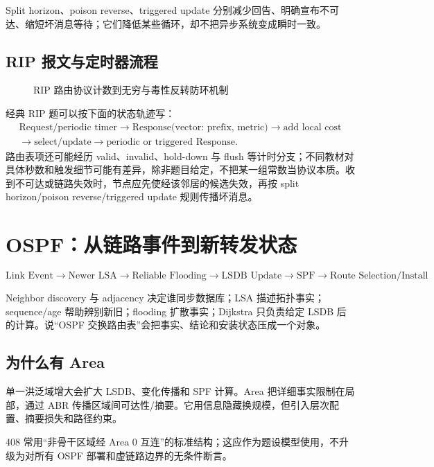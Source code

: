 \documentclass[11pt,a4paper]{ctexart}
\begin{document}
Split horizon、poison reverse、triggered update 分别减少回告、明确宣布不可达、缩短坏消息等待；它们降低某些循环，却不把异步系统变成瞬时一致。

\subsection{RIP 报文与定时器流程}

\begin{figure}[htbp]
  \centering
  \resizebox{0.96\linewidth}{!}{}
  \caption{RIP 路由协议计数到无穷与毒性反转防环机制}
  \label{fig:rip-count-infinity}
\end{figure}


经典 RIP 题可以按下面的状态轨迹写：
\[
\begin{gathered}
\text{Request/periodic timer}\to\text{Response(vector: prefix, metric)}\to\text{add local cost}\\
\to\text{select/update}\to\text{periodic or triggered Response}.
\end{gathered}
\]
路由表项还可能经历 valid、invalid、hold-down 与 flush 等计时分支；不同教材对具体秒数和触发细节可能有差异，除非题目给定，不把某一组常数当协议本质。收到不可达或链路失效时，节点应先使经该邻居的候选失效，再按 split horizon/poison reverse/triggered update 规则传播坏消息。

\section{OSPF：从链路事件到新转发状态}

\[
\boxed{
\text{Link Event}
\to\text{Newer LSA}
\to\text{Reliable Flooding}
\to\text{LSDB Update}
\to\text{SPF}
\to\text{Route Selection/Install}}
\]

Neighbor discovery 与 adjacency 决定谁同步数据库；LSA 描述拓扑事实；sequence/age 帮助辨别新旧；flooding 扩散事实；Dijkstra 只负责给定 LSDB 后的计算。说“OSPF 交换路由表”会把事实、结论和安装状态压成一个对象。

\subsection{为什么有 Area}

单一洪泛域增大会扩大 LSDB、变化传播和 SPF 计算。Area 把详细事实限制在局部，通过 ABR 传播区域间可达性/摘要。它用信息隐藏换规模，但引入层次配置、摘要损失和路径约束。

408 常用“非骨干区域经 Area 0 互连”的标准结构；这应作为题设模型使用，不升级为对所有 OSPF 部署和虚链路边界的无条件断言。
\end{document}
